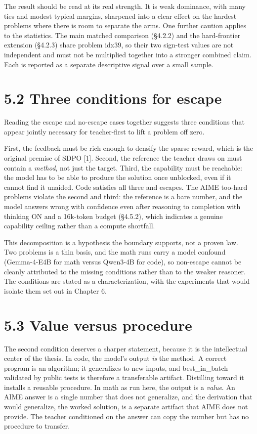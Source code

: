 The result should be read at its real strength. It is weak dominance, with many ties and modest typical margins, sharpened into a clear effect on the hardest problems where there is room to separate the arms. One further caution applies to the statistics. The main matched comparison (§4.2.2) and the hard-frontier extension (§4.2.3) share problem idx39, so their two sign-test values are not independent and must not be multiplied together into a stronger combined claim. Each is reported as a separate descriptive signal over a small sample.

\section{5.2 Three conditions for escape}\label{three-conditions-for-escape}

Reading the escape and no-escape cases together suggests three conditions that appear jointly necessary for teacher-first to lift a problem off zero.

First, the feedback must be rich enough to densify the sparse reward, which is the original premise of SDPO {[}1{]}. Second, the reference the teacher draws on must contain a \emph{method}, not just the target. Third, the capability must be reachable: the model has to be able to produce the solution once unblocked, even if it cannot find it unaided. Code satisfies all three and escapes. The AIME too-hard problems violate the second and third: the reference is a bare number, and the model answers wrong with confidence even after reasoning to completion with thinking ON and a 16k-token budget (§4.5.2), which indicates a genuine capability ceiling rather than a compute shortfall.

This decomposition is a hypothesis the boundary supports, not a proven law. Two problems is a thin basis, and the math runs carry a model confound (Gemma-4-E4B for math versus Qwen3-4B for code), so non-escape cannot be cleanly attributed to the missing conditions rather than to the weaker reasoner. The conditions are stated as a characterization, with the experiments that would isolate them set out in Chapter 6.

\section{5.3 Value versus procedure}\label{value-versus-procedure}

The second condition deserves a sharper statement, because it is the intellectual center of the thesis. In code, the model's output \emph{is} the method. A correct program is an algorithm; it generalizes to new inputs, and best\_in\_batch validated by public tests is therefore a transferable artifact. Distilling toward it installs a reusable procedure. In math as run here, the output is a \emph{value}. An AIME answer is a single number that does not generalize, and the derivation that would generalize, the worked solution, is a separate artifact that AIME does not provide. The teacher conditioned on the answer can copy the number but has no procedure to transfer.

